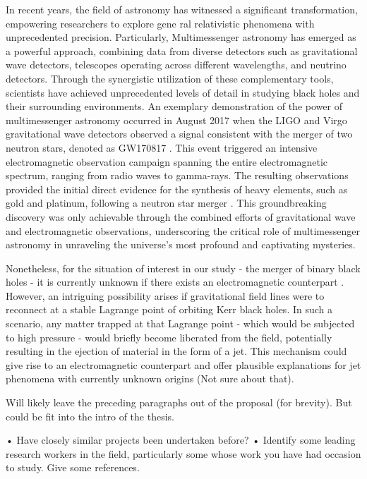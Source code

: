 In recent years, the field of astronomy has witnessed a significant transformation, empowering researchers to explore gene
ral relativistic phenomena with unprecedented precision. Particularly, Multimessenger astronomy has emerged as a powerful approach, combining data from diverse detectors such as gravitational wave detectors, telescopes operating across different wavelengths, and neutrino detectors. Through the synergistic utilization of these complementary tools, scientists have achieved unprecedented levels of detail in studying black holes and their surrounding environments. An exemplary demonstration of the power of multimessenger astronomy occurred in August 2017 when the LIGO and Virgo gravitational wave detectors observed a signal consistent with the merger of two neutron stars, denoted as GW170817 \cite{abbott2017gw170817}. This event triggered an intensive electromagnetic observation campaign spanning the entire electromagnetic spectrum, ranging from radio waves to gamma-rays. The resulting observations provided the initial direct evidence for the synthesis of heavy elements, such as gold and platinum, following a neutron star merger \cite{kasen2017origin}. This groundbreaking discovery was only achievable through the combined efforts of gravitational wave and electromagnetic observations, underscoring the critical role of multimessenger astronomy in unraveling the universe's most profound and captivating mysteries.

Nonetheless, for the situation of interest in our study - the merger of binary black holes - it is currently unknown if there exists an electromagnetic counterpart \cite{perna2019limits}. However, an intriguing possibility arises if gravitational field lines were to reconnect at a stable Lagrange point of orbiting Kerr black holes. In such a scenario, any matter trapped at that Lagrange point - which would be subjected to high pressure - would briefly become liberated from the field, potentially resulting in the ejection of material in the form of a jet. This mechanism could give rise to an electromagnetic counterpart and offer plausible explanations for jet phenomena with currently unknown origins (Not sure about that).

\danger Will likely leave the preceding paragraphs out of the proposal (for brevity). But could be fit into the intro of the thesis.

• Have closely similar projects been undertaken before?
• Identify some leading research workers in the field, particularly some whose work you have had occasion to study. Give some references.



